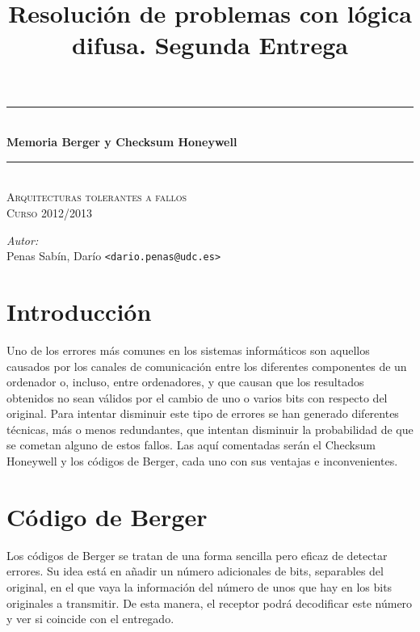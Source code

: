 \documentclass[a4paper]{article}
\title{Resolución de problemas con lógica difusa. Segunda Entrega}
\newcommand{\HRule}{\rule{\linewidth}{0.5mm}}
\begin{document}
	\begin{titlepage}
		\begin{center}

			\HRule \\[0.4cm]
			{ \huge \bfseries Memoria Berger y Checksum Honeywell}\\[0.4cm]
			\HRule \\[0cm]

			\vspace{1cm}
			\textsc{\Large Arquitecturas tolerantes a fallos}\\[0.5cm]
			\textsc{\Large Curso 2012/2013}\\[0.5cm]
		\end{center}

		\vfill
		\hfill
		\emph{Autor:}
		\vspace{0.5cm}
		\\  
		\vspace{0.1cm}
		\hfill Penas Sabín, Darío \texttt{<dario.penas@udc.es>}\\
		\vspace{0.1cm}

	\end{titlepage}
\tableofcontents
\clearpage

\section{Introducción}
	Uno de los errores más comunes en los sistemas informáticos son aquellos causados por los canales de comunicación entre los diferentes componentes de un ordenador o, incluso, entre ordenadores, y que causan que los resultados obtenidos no sean válidos por el cambio de uno o varios bits con respecto del original. Para intentar disminuir este tipo de errores se han generado diferentes técnicas, más o menos redundantes, que intentan disminuir la probabilidad de que se cometan alguno de estos fallos.
	Las aquí comentadas serán el Checksum Honeywell y los códigos de Berger, cada uno con sus ventajas e inconvenientes.

\section{Código de Berger}
	Los códigos de Berger se tratan de una forma sencilla pero eficaz de detectar errores. Su idea está en añadir un número adicionales de bits, separables del original, en el que vaya la información del número de unos que hay en los bits originales a transmitir. De esta manera, el receptor podrá decodificar este número y ver si coincide con el entregado.
\end{document}

